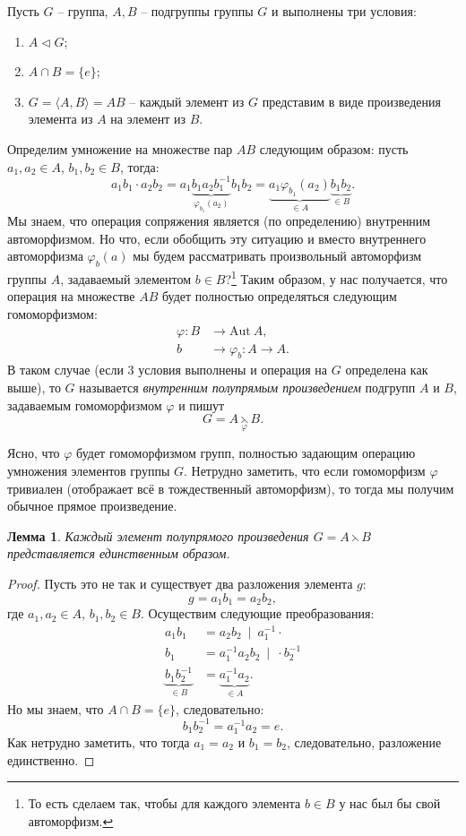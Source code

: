 \documentclass{article}
\newtheorem{lemma}{Лемма}[section]
\begin{document}
Пусть $G$ -- группа, $A, B$ -- подгруппы группы $G$ и выполнены три условия:
\begin{enumerate}
    \item $A \triangleleft G$;
    \item $A \cap B = \{ e \}$;
    \item $G = \langle A, B \rangle = AB$ -- каждый элемент из $G$ представим в виде произведения элемента из $A$ на элемент из $B$.
\end{enumerate}
Определим умножение на множестве пар $AB$ следующим образом: пусть $a_1, a_2 \in A$, $b_1, b_2 \in B$, тогда:
\[
    a_1 b_1 \cdot a_2 b_2 = a_1 \underbrace{b_1 a_2 b_1^{-1}}_{\varphi_{b_1}(a_2)} b_1 b_2 = \underbrace{a_1 \varphi_{b_1}(a_2)}_{\in A} \underbrace{b_1 b_2}_{\in B}.
\]
Мы знаем, что операция сопряжения является (по определению) внутренним автоморфизмом. Но что, если обобщить эту ситуацию и вместо внутреннего автоморфизма $\varphi_b(a)$ мы будем рассматривать произвольный автоморфизм группы $A$, задаваемый элементом $b \in B$?\footnote{То есть сделаем так, чтобы для каждого элемента $b \in B$ у нас был бы свой автоморфизм.} Таким образом, у нас получается, что операция на множестве $AB$ будет полностью определяться следующим гомоморфизмом:
\begin{align*}
    \varphi: B &\rightarrow \mathrm{Aut} \ A, \\
    b &\rightarrow \varphi_b : A \rightarrow A.
\end{align*}
В таком случае (если 3 условия выполнены и операция на $G$ определена как выше), то $G$ называется \textit{внутренним полупрямым произведением} подгрупп $A$ и $B$, задаваемым гомоморфизмом $\varphi$ и пишут $$ G = A  \underset{\varphi}{\leftthreetimes} B. $$

Ясно, что $\varphi$ будет гомоморфизмом групп, полностью задающим операцию умножения элементов группы $G$.
Нетрудно заметить, что если гомоморфизм $\varphi$ тривиален (отображает всё в тождественный автоморфизм), то тогда мы получим обычное прямое произведение.

\begin{lemma}
    Каждый элемент полупрямого произведения $ G = A \leftthreetimes B $ представляется единственным образом.
\end{lemma}
\begin{proof}
    Пусть это не так и существует два разложения элемента $g$: $$ g = a_1 b_1 = a_2 b_2, $$ где $a_1, a_2 \in A$, $b_1, b_2 \in B$.
    Осуществим следующие преобразования:
    \begin{align*}
        a_1 b_1 &= a_2 b_2 \ \mid \ a_1^{-1} \cdot \\
        b_1 &= a_1^{-1} a_2 b_2 \ \mid \ \cdot b_2^{-1} \\
        \underbrace{b_1 b_2^{-1}}_{\in B} &= \underbrace{a_1^{-1} a_2}_{\in A}.
    \end{align*}
    Но мы знаем, что $A \cap B = \{ e \}$, следовательно: $$ b_1 b_2^{-1} = a_1^{-1} a_2 = e. $$ Как нетрудно заметить, что тогда $a_1 = a_2$ и $b_1 = b_2$, следовательно, разложение единственно.
\end{proof}
\end{document}
